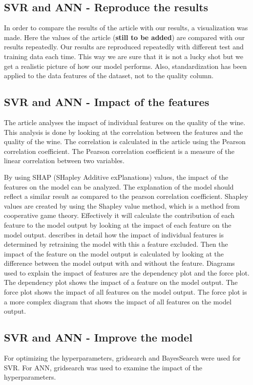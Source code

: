 \documentclass{article}
\begin{document}
\subsection{SVR and ANN - Reproduce the results}
In order to compare the results of the article with our results, a visualization was made. Here the values of the article (\textbf{still to be added}) are compared with our results repeatedly. Our results are reproduced repeatedly with different test and training data each time. This way we are sure that it is not a lucky shot but we get a realistic picture of how our model performs.
Also, standardization has been applied to the data features of the dataset, not to the quality column.

\subsection{SVR and ANN - Impact of the features}
The article analyses the impact of individual features on the quality of the wine.
This analysis is done by looking at the correlation between the features and the quality of the wine.
The correlation is calculated in the article using the Pearson correlation coefficient.
The Pearson correlation coefficient is a measure of the linear correlation between two variables.

By using SHAP (SHapley Additive exPlanations) values, the impact of the features on the model can be analyzed.
The explanation of the model should reflect a similar result as compared to the pearson correlation coefficient.
Shapley values are created by using the Shapley value method, which is a method from cooperative game theory.
Effectively it will calculate the contribution of each feature to the model output by looking at the impact of each feature on the model output.
\cite{lundberg2017unified} describes in detail how the impact of individual features is determined by retraining the model with this a feature excluded.
Then the impact of the feature on the model output is calculated by looking at the difference between the model output with and without the feature.
Diagrams used to explain the impact of features are the dependency plot and the force plot.
The dependency plot shows the impact of a feature on the model output.
The force plot shows the impact of all features on the model output.
The force plot is a more complex diagram that shows the impact of all features on the model output.

\subsection{SVR and ANN - Improve the model}
For optimizing the hyperparameters, gridsearch and BayesSearch were used for SVR. For ANN, gridsearch was used to examine the impact of the hyperparameters.
\end{document}
